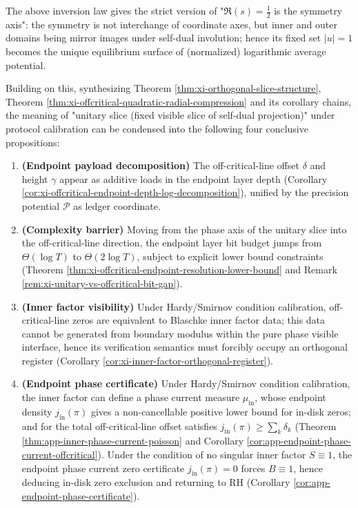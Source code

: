 The above inversion law gives the strict version of "\(\Re(s)=\tfrac12\) is the symmetry axis": the symmetry is not interchange of coordinate axes, but inner and outer domains being mirror images under self-dual involution; hence its fixed set \(|u|=1\) becomes the unique equilibrium surface of (normalized) logarithmic average potential.
\par
Building on this, synthesizing Theorem \ref{thm:xi-orthogonal-slice-structure}, Theorem \ref{thm:xi-offcritical-quadratic-radial-compression} and its corollary chains, the meaning of "unitary slice (fixed visible slice of self-dual projection)" under protocol calibration can be condensed into the following four conclusive propositions:
\begin{enumerate}
  \item \textbf{(Endpoint payload decomposition)}
  The off-critical-line offset \(\delta\) and height \(\gamma\) appear as additive loads in the endpoint layer depth (Corollary \ref{cor:xi-offcritical-endpoint-depth-log-decomposition}), unified by the precision potential \(\mathcal{P}\) as ledger coordinate.
  \item \textbf{(Complexity barrier)}
  Moving from the phase axis of the unitary slice into the off-critical-line direction, the endpoint layer bit budget jumps from \(\Theta(\log T)\) to \(\Theta(2\log T)\), subject to explicit lower bound constraints (Theorem \ref{thm:xi-offcritical-endpoint-resolution-lower-bound} and Remark \ref{rem:xi-unitary-vs-offcritical-bit-gap}).
  \item \textbf{(Inner factor visibility)}
  Under Hardy/Smirnov condition calibration, off-critical-line zeros are equivalent to Blaschke inner factor data; this data cannot be generated from boundary modulus within the pure phase visible interface, hence its verification semantics must forcibly occupy an orthogonal register (Corollary \ref{cor:xi-inner-factor-orthogonal-register}).
  \item \textbf{(Endpoint phase certificate)}
  Under Hardy/Smirnov condition calibration, the inner factor can define a phase current measure \(\mu_{\mathrm{in}}\), whose endpoint density \(j_{\mathrm{in}}(\pi)\) gives a non-cancellable positive lower bound for in-disk zeros; and for the total off-critical-line offset satisfies \(j_{\mathrm{in}}(\pi)\ge \sum_k\delta_k\) (Theorem \ref{thm:app-inner-phase-current-poisson} and Corollary \ref{cor:app-endpoint-phase-current-offcritical}).
  Under the condition of no singular inner factor \(S\equiv 1\), the endpoint phase current zero certificate \(j_{\mathrm{in}}(\pi)=0\) forces \(B\equiv 1\), hence deducing in-disk zero exclusion and returning to RH (Corollary \ref{cor:app-endpoint-phase-certificate}).
\end{enumerate}
\par

